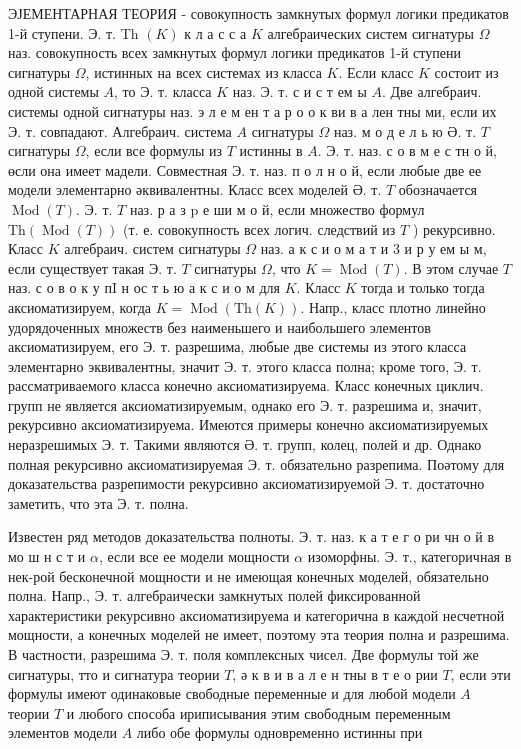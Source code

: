 \documentclass[10pt]{article}
\begin{document}
ЭЈЕМЕНТАРНАЯ ТЕОРИЯ - совокупность замкнутых формул логики предикатов 1-й ступени. Э. т. Th $(K)$ к л а с с а $K$ алгебраических систем сигнатуры $\Omega$ наз. совокупность всех замкнутых формул логики предикатов 1-й ступени сигнатуры $\Omega$, истинных на всех системах из класса $K$. Если класс $K$ состоит из одной системы $A$, то Э. т. класса $K$ наз. Э. т. с и с т ем ы $A$. Две алгебраич. системы одной сигнатуры наз. э л е м ен т а р о о к ви в а лен тны ми, если их Э. т. совпадают. Алгебраич. система $A$ сигнатуры $\Omega$ наз. м о д е л ь ю Ә. т. $T$ сигнатуры $\Omega$, если все формулы из $T$ истинны в $A$. Э. т. наз. с о в м е с тн о й, өсли она имеет мадели. Совместная Э. т. наз. п о л н о й, если любые две ее модели элементарно әквивалентны. Класс всех моделей Ә. т. $T$ обозначается $\operatorname{Mod}(T)$. Э. т. $T$ наз. р а з $\mathrm{p}$ е ши м о й, если множество формул $\mathrm{Th}(\operatorname{Mod}(T))$ (т. е. совокупность всех логич. следствий из $T$ ) рекурсивно. Класс $K$ алгебраич. систем сигнатуры $\Omega$ наз. а к с и о м а т и 3 и р у ем ы м, если существует такая Э. т. $T$ сигнатуры $\Omega$, что $K=\operatorname{Mod}(T)$. В этом случае $T$ наз. с о в о к у пI н ос т ь ю а к с и о м для $K$. Класс $K$ тогда и только тогда аксиоматизируем, когда $K=\operatorname{Mod}(\mathrm{Th}(K))$. Напр., класс плотно линейно удорядоченных множеств без наименьшего и наибольшего элементов аксиоматизируем, его Э. т. разрешима, любые две системы из этого класса элементарно эквивалентны, значит Э. т. этого класса полна; кроме того, Э. т. рассматриваемого класса конечно аксиоматизируема. Класс конечных циклич. групп не является аксиоматизируемым, однако его Э. т. разрешима и, значит, рекурсивно аксиоматизируема. Имеются примеры конечно аксиоматизируемых неразрешимых Э. т. Такими являются Ә. т. групп, колец, полей и др. Однако полная рекурсивно аксиоматизируемая Э. т. обязательно разрепима. Поәтому для доказательства разрепимости рекурсивно аксиоматизируемой Э. т. достаточно заметить, что эта Э. т. полна.



Известен ряд методов доказательства полноты. Э. т. наз. к а т е г о ри чн о й в мо ш н с т и $\alpha$, если все ее модели мощности $\alpha$ изоморфны. Э. т., категоричная в нек-рой бесконечной мощности и не имеющая конечных моделей, обязательно полна. Напр., Э. т. алгебраически замкнутых полей фиксированной характеристики рекурсивно аксиоматизируема и категорична в каждой несчетной мощности, а конечных моделей не имеет, поэтому эта теория полна и разрешима. В частности, разрешима Э. т. поля комплексных чисел. Две формулы той же сигнатуры, тто и сигнатура теории $T$, ә к в и в а л е н тны в т е о рии $T$, если эти формулы имеют одинаковые свободные переменные и для любой модели $A$ теории $T$ и любого способа ириписывания этим свободным переменным элементов модели $A$ либо обе формулы одновременно истинны при
\end{document}
